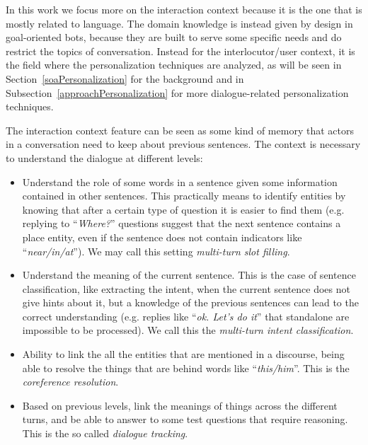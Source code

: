 In this work we focus more on the interaction context because it is the one that is mostly related to language. The domain knowledge is instead given by design in goal-oriented bots, because they are built to serve some specific needs and do restrict the topics of conversation. Instead for the interlocutor/user context, it is the field where the personalization techniques are analyzed, as will be seen in Section~\ref{soaPersonalization} for the background and in Subsection~\ref{approachPersonalization} for more dialogue-related personalization techniques.

The interaction context feature can be seen as some kind of memory that actors in a conversation need to keep about previous sentences. The context is necessary to understand the dialogue at different levels:

\begin{itemize}
	\item Understand the role of some words in a sentence given some information contained in other sentences. This practically means to identify entities by knowing that after a certain type of question it is easier to find them (e.g. replying to ``\textit{Where?}'' questions suggest that the next sentence contains a place entity, even if the sentence does not contain indicators like ``\textit{near/in/at}''). We may call this setting \textit{multi-turn slot filling}.
	\item Understand the meaning of the current sentence. This is the case of sentence classification, like extracting the intent, when the current sentence does not give hints about it, but a knowledge of the previous sentences can lead to the correct understanding (e.g. replies like ``\textit{ok. Let's do it}'' that standalone are impossible to be processed). We call this the \textit{multi-turn intent classification}.
	\item Ability to link the all the entities that are mentioned in a discourse, being able to resolve the things that are behind words like ``\textit{this/him}''. This is the \textit{coreference resolution}.
	\item Based on previous levels, link the meanings of things across the different turns, and be able to answer to some test questions that require reasoning. This is the so called  \textit{dialogue tracking}.
\end{itemize}

